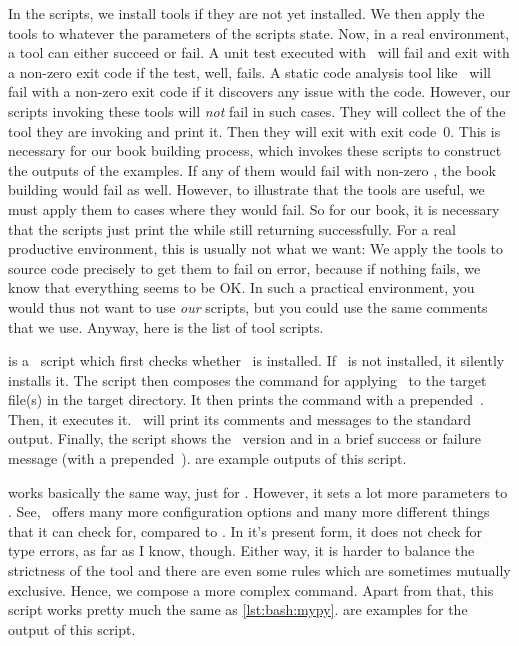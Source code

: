 In the scripts, we install tools if they are not yet installed.
We then apply the tools to whatever the parameters of the scripts state.
Now, in a real environment, a tool can either succeed or fail.
A unit test executed with \pytest\ will fail and exit with a non-zero exit code if the test, well, fails.
A static code analysis tool like \ruff\ will fail with a non-zero exit code if it discovers any issue with the code.
However, our scripts invoking these tools will \emph{not} fail in such cases.
They will collect the  of the tool they are invoking and print it.
Then they will exit with exit code~0.
This is necessary for our book building process, which invokes these scripts to construct the outputs of the examples.
If any of them would fail with non-zero , the book building would fail as well.
However, to illustrate that the tools are useful, we must apply them to cases where they would fail.
So for our book, it is necessary that the scripts just print the  while still returning successfully.
For a real productive environment, this is usually not what we want:
We apply the tools to source code precisely to get them to fail on error, because if nothing fails, we know that everything seems to be OK.
In such a practical environment, you would thus not want to use \emph{our} scripts, but you could use the same comments that we use.
Anyway, here is the list of tool scripts.

 is a \bash\ script which first checks whether \mypy\ is installed.
If \mypy\ is not installed, it silently installs it.
The script then composes the command for applying \mypy\ to the target file(s) in the target directory.
It then prints the command with a prepended~\expandafter\textil{\$}.
Then, it executes it.
\mypy\ will print its comments and messages to the standard output.
Finally, the script shows the \mypy\ version and  in a brief success or failure message (with a prepended~\expandafter\textil{\#}).
 are example outputs of this script.

 works basically the same way, just for \ruff.
However, it sets a lot more parameters to \ruff.
See, \ruff\ offers many more configuration options and many more different things that it can check for, compared to \mypy.
In it's present form, it does not check for type errors, as far as I know, though.
Either way, it is harder to balance the strictness of the tool and there are even some rules which are sometimes mutually exclusive.
Hence, we compose a more complex command.
Apart from that, this script works pretty much the same as \cref{lst:bash:mypy}.
 are examples for the output of this script.

